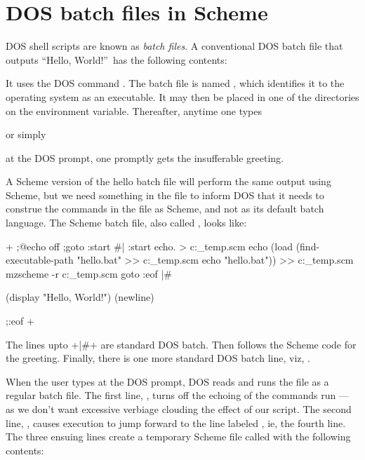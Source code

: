 \chapter{DOS batch files in Scheme}
\label{dos}

DOS shell scripts are known as {\em batch files}.  A
conventional DOS batch file that outputs ``Hello,
World!''\ has the following contents:


It uses the DOS command .  The batch file is
named , which identifies it to the
operating system as an executable.  It may then be
placed in one of the directories on the 
environment variable.  Thereafter, anytime one types


or simply


\n at the DOS prompt, one promptly gets the
insufferable greeting.

A Scheme version of the hello batch file will perform
the same output using Scheme, but we need something in
the file to inform DOS that it needs to construe the
commands in the file as Scheme, and not as its default
batch language.  The Scheme batch file, also called
, looks like:

\p+
;@echo off
;goto :start
#|
:start
echo. > c:\_temp.scm
echo (load (find-executable-path "hello.bat" >> c:\_temp.scm
echo "hello.bat")) >> c:\_temp.scm
mzscheme -r c:\_temp.scm %
goto :eof
|#

(display "Hello, World!")
(newline)

;:eof
+

The lines upto \p+|#+ are standard DOS batch.  Then
follows the Scheme code for the greeting.  Finally,
there is one more standard DOS batch line, viz,
.  

When the user types  at the DOS prompt, DOS
reads and runs the file  as a regular
batch file.  The first line, , turns off
the echoing of the commands run --- as we don't want
excessive verbiage clouding the effect of our script.
The second line, , causes execution to
jump forward to the line labeled , ie, the
fourth line.  The three ensuing  lines create a
temporary Scheme file called  with the
following contents:


